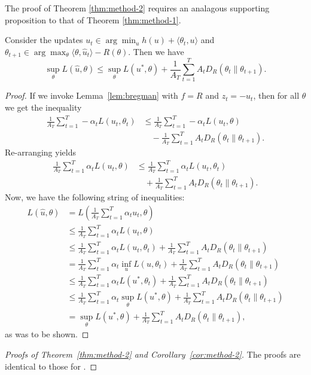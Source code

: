 \documentclass{article} %
\begin{document}
The proof of Theorem \ref{thm:method-2} requires an analagous supporting proposition to that of Theorem \ref{thm:method-1}.
\begin{proposition}
\label{prop:method-2}
Consider the updates $u_t \in \arg\min_{u} h(u) + \langle \theta_t, u \rangle$ 
and $\theta_{t+1} \in \arg\max_{\theta} \langle \theta, \hat{u}_t \rangle - R(\theta)$. 
Then we have 
\begin{equation}
\sup_{\theta} L(\hat{u}, \theta) \leq \sup_{\theta} L(u^*, \theta) + \frac{1}{A_T} \sum_{t=1}^T A_tD_{R}(\theta_t \| \theta_{t+1}).
\end{equation}
\end{proposition}
\begin{proof}
If we invoke Lemma~\ref{lem:bregman} with $f=R$ and $z_t=-u_t$, then for all $\theta$ we get 
the inequality
\begin{align}
\frac{1}{A_T} \sum_{t=1}^T -\alpha_t L(u_t, \theta_t) 
&\leq \frac{1}{A_T} \sum_{t=1}^T -\alpha_t L(u_t, \theta) \\
&\quad - \frac{1}{A_T} \sum_{t=1}^T A_tD_R(\theta_t \| \theta_{t+1}). \nonumber
\end{align}
Re-arranging yields
\begin{align}
\frac{1}{A_T }\sum_{t=1}^T \alpha_t L(u_t, \theta) 
&\leq \frac{1}{A_T} \sum_{t=1}^T \alpha_t L(u_t, \theta_t) \\
&\quad+ \frac{1}{A_T} \sum_{t=1}^T A_tD_R(\theta_t \| \theta_{t+1}). 
\end{align}
Now, we have the following string of inequalities:
\begin{align*} 
L(\hat{u}, \theta) &= L\left(\frac{1}{A_T} \sum_{t=1}^T \alpha_t u_t, \theta\right) \\
 &\leq \frac{1}{A_T} \sum_{t=1}^T \alpha_t L(u_t, \theta) \\
 &\leq \frac{1}{A_T} \sum_{t=1}^T \alpha_t L(u_t, \theta_t) + \frac{1}{A_T} \sum_{t=1}^T A_t D_R(\theta_t \| \theta_{t+1}) \\
 &= \frac{1}{A_T} \sum_{t=1}^T \alpha_t \inf_{u} L(u, \theta_t) + \frac{1}{A_T} \sum_{t=1}^T A_tD_R(\theta_t \| \theta_{t+1}) \\
 &\leq \frac{1}{A_T} \sum_{t=1}^T \alpha_t L(u^*, \theta_t) + \frac{1}{A_T} \sum_{t=1}^T A_tD_R(\theta_t \| \theta_{t+1}) \\
 &\leq \frac{1}{A_T} \sum_{t=1}^T \alpha_t \sup_{\theta} L(u^*, \theta) + \frac{1}{A_T} \sum_{t=1}^T A_tD_R(\theta_t \| \theta_{t+1}) \\
 &= \sup_{\theta} L(u^*, \theta) + \frac{1}{A_T} \sum_{t=1}^T A_tD_R(\theta_t \| \theta_{t+1}),
\end{align*}
as was to be shown.
\end{proof}

\begin{proof}[Proofs of Theorem~\ref{thm:method-2} and Corollary~\ref{cor:method-2}]
The proofs are identical to those for \primal.
\end{proof}
\end{document}

